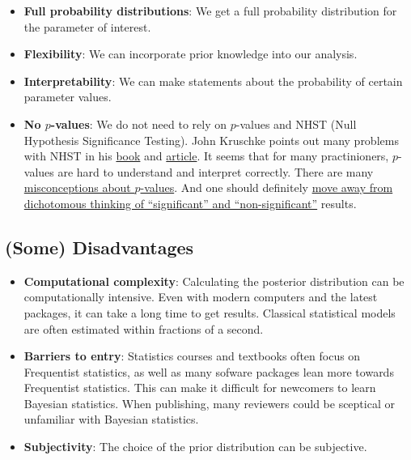 \documentclass[
]{book}
\begin{document}
\begin{itemize}
\item
  \textbf{Full probability distributions}: We get a full probability distribution for the parameter of interest.
\item
  \textbf{Flexibility}: We can incorporate prior knowledge into our analysis.
\item
  \textbf{Interpretability}: We can make statements about the probability of certain parameter values.
\item
  \textbf{No \(p\)-values}: We do not need to rely on \(p\)-values and NHST (Null Hypothesis Significance Testing).
  John Kruschke points out many problems with
  NHST in his \href{https://nyu-cdsc.github.io/learningr/assets/kruschke_bayesian_in_R.pdf}{book} and
  \href{https://www.krigolsonteaching.com/uploads/4/3/8/4/43848243/kruschke2012jepg.pdf}{article}. It seems that for many practinioners, \(p\)-values are
  hard to understand and interpret correctly. There are many
  \href{https://www.sciencedirect.com/science/article/abs/pii/S0037196308000620}{misconceptions about \(p\)-values}.
  And one should definitely
  \href{https://www.tandfonline.com/doi/full/10.1080/00031305.2019.1583913}{move away from dichotomous thinking of ``significant'' and ``non-significant''} results.
\end{itemize}

\subsection{(Some) Disadvantages}\label{some-disadvantages}

\begin{itemize}
\item
  \textbf{Computational complexity}: Calculating the posterior distribution can be computationally intensive.
  Even with modern computers and the latest packages, it can take a long time to get results. Classical statistical models
  are often estimated within fractions of a second.
\item
  \textbf{Barriers to entry}: Statistics courses and textbooks often focus on Frequentist statistics, as well as many
  sofware packages lean more towards Frequentist statistics. This can make it difficult for newcomers to learn Bayesian statistics.
  When publishing, many reviewers could be sceptical or unfamiliar with Bayesian statistics.
\item
  \textbf{Subjectivity}: The choice of the prior distribution can be subjective.
\end{itemize}
\end{document}
